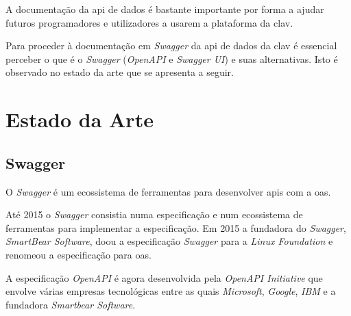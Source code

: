 A documentação da \acrshort{api} de dados é bastante importante por forma a ajudar futuros programadores e
utilizadores a usarem a plataforma da \acrshort{clav}.

Para proceder à documentação em \textit{Swagger} da \acrshort{api} de dados da \acrshort{clav} é essencial
perceber o que é o \textit{Swagger} (\textit{OpenAPI} e \textit{Swagger UI}) e suas alternativas.
Isto é observado no estado da arte que se apresenta a seguir.

\section{Estado da Arte}

\subsection{Swagger}
O \textit{Swagger} é um ecossistema de ferramentas para desenvolver \acrshort{api}s com a \acrfull{oas}.

Até 2015 o \textit{Swagger} consistia numa especificação e num ecossistema de ferramentas para implementar a 
especificação. Em 2015 a fundadora do \textit{Swagger}, \textit{SmartBear Software}, doou a especificação 
\textit{Swagger} para a \textit{Linux Foundation} e renomeou a especificação para \acrlong{oas}.~\cite{wiswagger}

A especificação \textit{OpenAPI} é agora desenvolvida pela \textit{OpenAPI Initiative} que envolve várias 
empresas tecnológicas entre as quais \textit{Microsoft}, \textit{Google}, \textit{IBM} e a 
fundadora \textit{Smartbear Software}.


